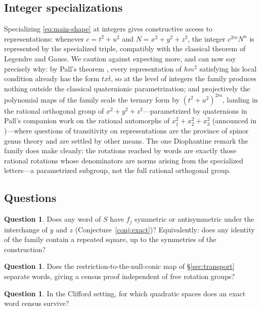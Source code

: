 \documentclass[11pt]{article}
\theoremstyle{definition}
\newtheorem{question}[theorem]{Question}
\theoremstyle{remark}
\begin{document}
\subsection{Integer specializations}
Specializing \eqref{eq:main-shape} at integers gives constructive access to representations: whenever $c=t^2+u^2$ and $N=x^2+y^2+z^2$, the integer $c^{2m}N^{n}$ is represented by the specialized triple, compatibly with the classical theorem of Legendre and Gauss. We caution against expecting more, and can now say precisely why: by Pall's theorem \cite[\S8]{Pall}, every representation of $hm^2$ satisfying his local condition already has the form $tx\bar t$, so at the level of integers the family produces nothing outside the classical quaternionic parametrization; and projectively the polynomial maps of the family scale the ternary form by $(t^2+u^2)^{2m}$, landing in the rational orthogonal group of $x^2+y^2+z^2$---parametrized by quaternions in Pall's companion work on the rational automorphs of $x_1^2+x_2^2+x_3^2$ (announced in \cite{Pall})---where questions of transitivity on representations are the province of spinor genus theory and are settled by other means. The one Diophantine remark the family does make cleanly: the rotations reached by words are exactly those rational rotations whose denominators are norms arising from the specialized letters---a parametrized subgroup, not the full rational orthogonal group.

\subsection{Questions}
\begin{question}
Does any word of $S$ have $f_j$ symmetric or antisymmetric under the interchange of $y$ and $z$ (Conjecture~\ref{conj:exact})? Equivalently: does any identity of the family contain a repeated square, up to the symmetries of the construction?
\end{question}
\begin{question}
Does the restriction-to-the-null-conic map of \S\ref{sec:transport} separate words, giving a census proof independent of free rotation groups?
\end{question}
\begin{question}
In the Clifford setting, for which quadratic spaces does an exact word census survive?
\end{question}
\end{document}
